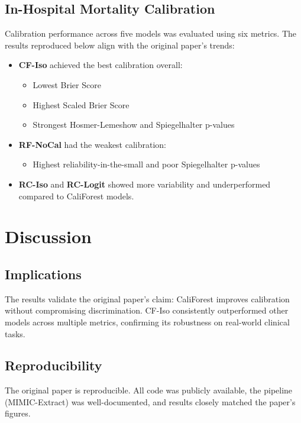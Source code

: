 \documentclass{article}
\begin{document}
\subsection*{In-Hospital Mortality Calibration}

Calibration performance across five models was evaluated using six metrics. The results reproduced below align with the original paper’s trends:

\begin{itemize}
\item \textbf{CF-Iso} achieved the best calibration overall:
\begin{itemize}
\item Lowest Brier Score
\item Highest Scaled Brier Score
\item Strongest Hosmer-Lemeshow and Spiegelhalter p-values
\end{itemize}
\item \textbf{RF-NoCal} had the weakest calibration:
\begin{itemize}
\item Highest reliability-in-the-small and poor Spiegelhalter p-values
\end{itemize}
\item \textbf{RC-Iso} and \textbf{RC-Logit} showed more variability and underperformed compared to CaliForest models.
\end{itemize}

\section*{Discussion}

\subsection*{Implications}
The results validate the original paper’s claim: CaliForest improves calibration without compromising discrimination. CF-Iso consistently outperformed other models across multiple metrics, confirming its robustness on real-world clinical tasks.

\subsection*{Reproducibility}
The original paper is reproducible. All code was publicly available, the pipeline (MIMIC-Extract) was well-documented, and results closely matched the paper’s figures.
\end{document}
